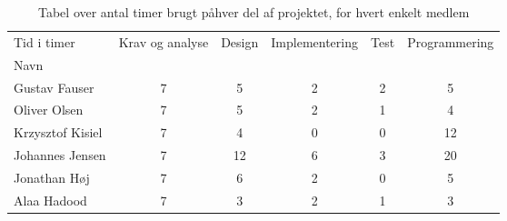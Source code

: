 \begin{table}[H]
\begin{tabular}{lccccc}
\hline
\multicolumn{1}{|l|}{Tid i timer} & Krav og analyse & \multicolumn{1}{l}{Design} & Implementering & Test & Programmering \\ \cline{2-6} 
\multicolumn{1}{|l|}{Navn} &  & \multicolumn{1}{l}{} &  &  &  \\ \cline{1-1}
Gustav Fauser & 7 & 5 & 2 & 2 &  5  \\
Oliver Olsen & 7 & 5 & 2 & 1 & 4 \\
Krzysztof Kisiel & 7 & 4 & 0 & 0 & 12  \\
Johannes Jensen & 7 & 12 & 6 & 3 & 20 \\
Jonathan H\o j & 7 & 6 & 2 & 0 & 5 \\
Alaa Hadood & 7 & 3 & 2 & 1 & 3 \\ \hline
\end{tabular}
\caption{Tabel over antal timer brugt p\aa \space hver del af projektet, for hvert enkelt medlem}
\label{table:timeplan}
\end{table}

